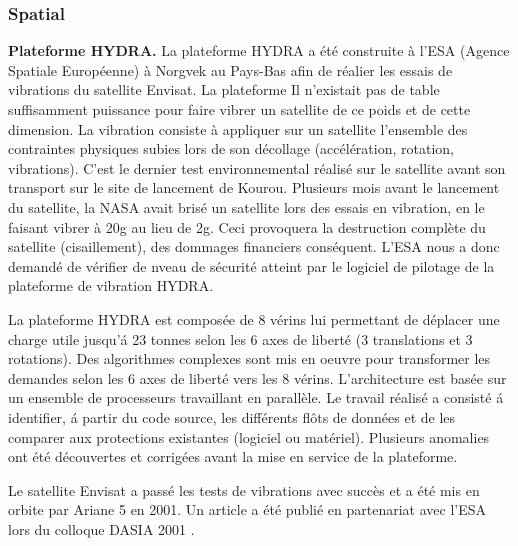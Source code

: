 \documentclass[a4paper,12pt]{article}
\begin{document}
\subsubsection{Spatial}
\textbf{Plateforme HYDRA.} La plateforme HYDRA a \'et\'e construite
\`a l'ESA (Agence Spatiale Europ\'eenne) \`a  Norgvek au Pays-Bas afin
de r\'ealier les essais de vibrations du satellite Envisat. La
plateforme  Il n'existait pas de table suffisamment puissance pour
faire vibrer un satellite de ce poids et de cette dimension. La
vibration consiste \`a appliquer sur un satellite l'ensemble des
contraintes physiques subies lors de son d\'ecollage
(acc\'el\'eration, rotation, vibrations). C'est le dernier test
environnemental r\'ealis\'e sur le satellite avant son transport sur
le site de lancement de Kourou. Plusieurs mois avant le lancement du
satellite, la NASA avait bris\'e un satellite lors des essais en
vibration, en le faisant vibrer à 20g au lieu de 2g. Ceci provoquera
la destruction compl\`ete du satellite (cisaillement), des dommages
financiers cons\'equent. L'ESA nous a donc
demand\'e de v\'erifier de nveau de s\'ecurit\'e atteint par le
logiciel de pilotage de la plateforme de vibration HYDRA. 

La plateforme HYDRA est compos\'ee de 8 v\'erins lui permettant de
d\'eplacer une charge utile jusqu'\'a 23 tonnes selon les 6 axes de
libert\'e (3 translations et 3 rotations). Des algorithmes complexes
sont mis en oeuvre pour transformer les demandes selon les 6 axes de
libert\'e  vers les 8 v\'erins. L'architecture est bas\'ee sur
un ensemble de processeurs travaillant en parall\`ele. Le travail
r\'ealis\'e a consist\'e \'a identifier, \'a partir du code source,
les diff\'erents fl\^ots de donn\'ees et de les comparer aux
protections existantes (logiciel ou mat\'eriel). Plusieurs anomalies
ont \'et\'e d\'ecouvertes et corrig\'ees avant la mise en service de
la plateforme. 

Le satellite Envisat a pass\'e les tests de vibrations avec succ\`es et
a \'et\'e mis en orbite par Ariane 5 en 2001. Un article a \'et\'e
publi\'e en  partenariat avec l'ESA lors du colloque DASIA 2001
\cite{DASIA2001}.
\end{document}
